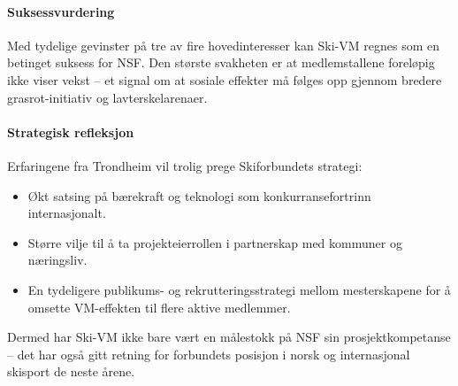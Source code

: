 \paragraph{Suksessvurdering}
Med tydelige gevinster på tre av fire hovedinteresser kan Ski-VM regnes som en betinget suksess for NSF. Den største svakheten er at medlemstallene foreløpig ikke viser vekst -- et signal om at sosiale effekter må følges opp gjennom bredere grasrot-initiativ og lavterskelarenaer.

\paragraph{Strategisk refleksjon}
Erfaringene fra Trondheim vil trolig prege Skiforbundets strategi:
\begin{itemize}
    \item Økt satsing på bærekraft og teknologi som konkurransefortrinn internasjonalt.
    \item Større vilje til å ta projekteierrollen i partnerskap med kommuner og næringsliv.
    \item En tydeligere publikums- og rekrutteringsstrategi mellom mesterskapene for å omsette VM-effekten til flere aktive medlemmer.
\end{itemize}

Dermed har Ski-VM ikke bare vært en målestokk på NSF sin prosjektkompetanse -- det har også gitt retning for forbundets posisjon i norsk og internasjonal skisport de neste årene.